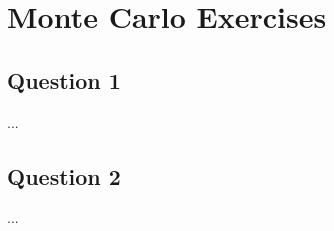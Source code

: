 \documentclass{article}
\begin{document}
\section{Monte Carlo Exercises}

\subsection{Question 1}

...

\subsection{Question 2}

...
\end{document}
